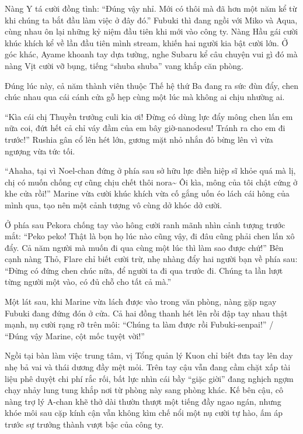 \documentclass[../main.tex]{subfiles}
\begin{document}

Nàng Y tá cười đồng tình: ``Đúng vậy nhỉ. Mới có thôi mà đã hơn một năm kể từ khi chúng ta bắt đầu làm việc ở đây đó.'' Fubuki thì đang ngồi với Miko và Aqua, cùng nhau ôn lại những kỷ niệm đầu tiên khi mới vào công ty. Nàng Hầu gái cười khúc khích kể về lần đầu tiên mình stream, khiến hai người kia bật cười lớn. Ở góc khác, Ayame khoanh tay dựa tường, nghe Subaru kể câu chuyện vui gì đó mà nàng Vịt cười vỡ bụng, tiếng ``shuba shuba'' vang khắp căn phòng.

Đúng lúc này, cả năm thành viên thuộc Thế hệ thứ Ba đang ra sức đùn đẩy, chen chúc nhau qua cái cánh cửa gỗ hẹp cùng một lúc mà không ai chịu nhường ai.

``Kìa cái chị Thuyền trưởng culi kia ơi! Đừng có dùng lực đẩy mông chen lấn em nữa coi, đứt hết cả chỉ váy đầm của em bây giờ-nanodesu! Tránh ra cho em đi trước!'' Rushia gân cổ lên hét lớn, gương mặt nhỏ nhắn đỏ bừng lên vì vừa ngượng vừa tức tối.

``Ahaha, tại vì Noel-chan đứng ở phía sau sở hữu lực điền hiệp sĩ khỏe quá mà lị, chị có muốn chống cự cũng chịu chết thôi nora\~{} Ôi kìa, mông của tôi chật cứng ở khe cửa rồi!'' Marine vừa cười khúc khích vừa cố gắng uốn éo lách cái hông của mình qua, tạo nên một cảnh tượng vô cùng dở khóc dở cười.

Ở phía sau Pekora chống tay vào hông cười ranh mãnh nhìn cảnh tượng trước mắt: ``Peko peko! Thật là bọn họ lúc nào cũng vậy, đi đâu cũng phải chen lấn xô đẩy. Cả năm người mà muốn đi qua cùng một lúc thì làm sao được chứ!'' Bên cạnh nàng Thỏ, Flare chỉ biết cười trừ, nhẹ nhàng đẩy hai người bạn về phía sau: ``Đừng có đứng chen chúc nữa, để người ta đi qua trước đi. Chúng ta lần lượt từng người một vào, có đủ chỗ cho tất cả mà.''


Một lát sau, khi Marine vừa lách được vào trong văn phòng, nàng gặp ngay Fubuki đang đứng đón ở cửa. Cả hai đồng thanh hét lên rồi đập tay nhau thật mạnh, nụ cười rạng rỡ trên môi: ``Chúng ta làm được rồi Fubuki-senpai!'' / ``Đúng vậy Marine, cột mốc tuyệt vời!''


Ngồi tại bàn làm việc trung tâm, vị Tổng quản lý Kuon chỉ biết đưa tay lên day nhẹ bả vai và thái dương đầy mệt mỏi. Trên tay cậu vẫn đang cầm chặt xấp tài liệu phê duyệt chi phí rắc rối, bất lực nhìn cái bầy ``giặc giời'' đang nghịch ngợm chạy nhảy lung tung khắp nơi từ phòng này sang phòng khác. Kế bên cậu, cô nàng trợ lý A-chan khẽ thở dài thườn thượt một tiếng đầy ngao ngán, nhưng khóe môi sau cặp kính cận vẫn không kìm chế nổi một nụ cười tự hào, ấm áp trước sự trưởng thành vượt bậc của công ty.
\end{document}
